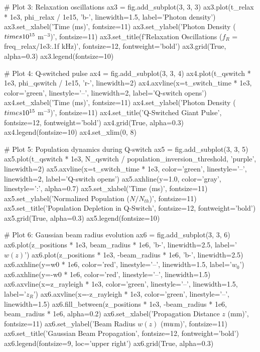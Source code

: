 \documentclass[a4paper, 11pt]{article}
\begin{document}
\begin{pycode}
# Plot 3: Relaxation oscillations
ax3 = fig.add_subplot(3, 3, 3)
ax3.plot(t_relax * 1e3, phi_relax / 1e15, 'b-', linewidth=1.5, label='Photon density')
ax3.set_xlabel('Time (ms)', fontsize=11)
ax3.set_ylabel('Photon Density ($\\times 10^{15}$ m$^{-3}$)', fontsize=11)
ax3.set_title(f'Relaxation Oscillations ($f_R$ = {freq_relax/1e3:.1f} kHz)', fontsize=12, fontweight='bold')
ax3.grid(True, alpha=0.3)
ax3.legend(fontsize=10)

# Plot 4: Q-switched pulse
ax4 = fig.add_subplot(3, 3, 4)
ax4.plot(t_qswitch * 1e3, phi_qswitch / 1e15, 'r-', linewidth=2)
ax4.axvline(x=t_switch_time * 1e3, color='green', linestyle='--', linewidth=2, label='Q-switch opens')
ax4.set_xlabel('Time (ms)', fontsize=11)
ax4.set_ylabel('Photon Density ($\\times 10^{15}$ m$^{-3}$)', fontsize=11)
ax4.set_title('Q-Switched Giant Pulse', fontsize=12, fontweight='bold')
ax4.grid(True, alpha=0.3)
ax4.legend(fontsize=10)
ax4.set_xlim(0, 8)

# Plot 5: Population dynamics during Q-switch
ax5 = fig.add_subplot(3, 3, 5)
ax5.plot(t_qswitch * 1e3, N_qswitch / population_inversion_threshold, 'purple', linewidth=2)
ax5.axvline(x=t_switch_time * 1e3, color='green', linestyle='--', linewidth=2, label='Q-switch opens')
ax5.axhline(y=1.0, color='gray', linestyle=':', alpha=0.7)
ax5.set_xlabel('Time (ms)', fontsize=11)
ax5.set_ylabel('Normalized Population ($N / N_{th}$)', fontsize=11)
ax5.set_title('Population Depletion in Q-Switch', fontsize=12, fontweight='bold')
ax5.grid(True, alpha=0.3)
ax5.legend(fontsize=10)

# Plot 6: Gaussian beam radius evolution
ax6 = fig.add_subplot(3, 3, 6)
ax6.plot(z_positions * 1e3, beam_radius * 1e6, 'b-', linewidth=2.5, label='$w(z)$')
ax6.plot(z_positions * 1e3, -beam_radius * 1e6, 'b-', linewidth=2.5)
ax6.axhline(y=w0 * 1e6, color='red', linestyle='--', linewidth=1.5, label='$w_0$')
ax6.axhline(y=-w0 * 1e6, color='red', linestyle='--', linewidth=1.5)
ax6.axvline(x=z_rayleigh * 1e3, color='green', linestyle='--', linewidth=1.5, label='$z_R$')
ax6.axvline(x=-z_rayleigh * 1e3, color='green', linestyle='--', linewidth=1.5)
ax6.fill_between(z_positions * 1e3, -beam_radius * 1e6, beam_radius * 1e6, alpha=0.2)
ax6.set_xlabel('Propagation Distance $z$ (mm)', fontsize=11)
ax6.set_ylabel('Beam Radius $w(z)$ ($\\mu$m)', fontsize=11)
ax6.set_title('Gaussian Beam Propagation', fontsize=12, fontweight='bold')
ax6.legend(fontsize=9, loc='upper right')
ax6.grid(True, alpha=0.3)


\end{pycode}
\end{document}
